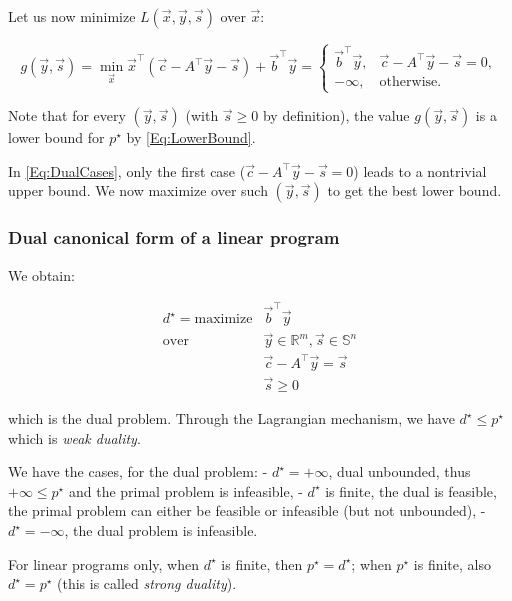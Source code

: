 \documentclass[11pt]{article}
\begin{document}
Let us now minimize \(L(\vec{x}, \vec{y}, \vec{s})\) over \(\vec{x}\):

\begin{equation}
\label{Eq:DualCases}
g(\vec{y}, \vec{s}) = \min_{\vec{x}} \vec{x}^\top (\vec{c} - A^\top \vec{y} - \vec{s}) + \vec{b}^\top \vec{y} = \begin{cases} \vec{b}^\top \vec{y}, & \vec{c} - A^\top \vec{y} - \vec{s} = 0, \\ -\infty, & \text{otherwise}. \end{cases}
\end{equation}

Note that for every \((\vec{y}, \vec{s})\) (with \(\vec{s} \ge 0\) by
definition), the value \(g(\vec{y}, \vec{s})\) is a lower bound for
\(p^\star\) by \eqref{Eq:LowerBound}.

In \eqref{Eq:DualCases}, only the first case
(\(\vec{c} - A^\top \vec{y} - \vec{s} = 0\)) leads to a nontrivial upper
bound. We now maximize over such \((\vec{y}, \vec{s})\) to get the best
lower bound.

\subsubsection{Dual canonical form of a linear
program}\label{dual-canonical-form-of-a-linear-program}

We obtain:

\begin{equation}
\label{Eq:DualForm}
  \begin{array}{rl}
    d^\star = \text{maximize} & \vec{b}^\top \vec{y} \\
    \text{over} & \vec{y} \in \mathbb{R}^m, \vec{s} \in \mathbb{S}^n \\
    & \vec{c} - A^\top \vec{y} = \vec{s} \\
    & \vec{s} \ge 0
  \end{array}
\end{equation}

which is the dual problem. Through the Lagrangian mechanism, we have
\(d^\star \le p^\star\) which is \emph{weak duality}.

We have the cases, for the dual problem: - \(d^\star = +\infty\), dual
unbounded, thus \(+\infty \le p^\star\) and the primal problem is
infeasible, - \(d^\star\) is finite, the dual is feasible, the primal
problem can either be feasible or infeasible (but not unbounded), -
\(d^\star = -\infty\), the dual problem is infeasible.

For linear programs only, when \(d^\star\) is finite, then
\(p^\star = d^\star\); when \(p^\star\) is finite, also
\(d^\star = p^\star\) (this is called \emph{strong duality}).
\end{document}

